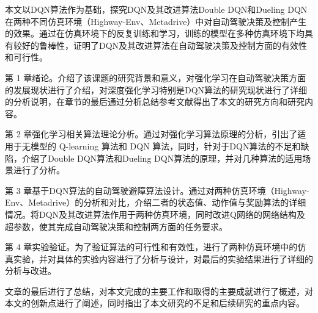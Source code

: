 本文以DQN算法作为基础，探究DQN及其改进算法Double DQN和Dueling DQN在两种不同仿真环境（Highway-Env、Metadrive）中对自动驾驶决策及控制产生的效果。通过在仿真环境下的反复训练和学习，训练的模型在多种仿真环境下均具有较好的鲁棒性，证明了DQN及其改进算法在自动驾驶决策及控制方面的有效性和可行性。

第 1 章绪论。介绍了该课题的研究背景和意义，对强化学习在自动驾驶决策方面的发展现状进行了介绍，对深度强化学习特别是DQN算法的研究现状进行了详细的分析说明，在章节的最后通过分析总结参考文献得出了本文的研究方向和研究内容。

第 2 章强化学习相关算法理论分析。通过对强化学习算法原理的分析，引出了适用于无模型的 Q-learning 算法和 DQN 算法，同时，针对于DQN算法的不足和缺陷，介绍了Double DQN算法和Dueling DQN算法的原理，并对几种算法的适用场景进行了分析。

第 3 章基于DQN算法的自动驾驶避障算法设计。通过对两种仿真环境（Highway-Env、Metadrive）的分析和对比，介绍二者的状态值、动作值与奖励算法的详细情况。将DQN及其改进算法作用于两种仿真环境，同时改进Q网络的网络结构及超参数，使其完成自动驾驶决策和控制两方面的任务要求。

第 4 章实验验证。为了验证算法的可行性和有效性，进行了两种仿真环境中的仿真实验，并对具体的实验内容进行了分析与设计，对最后的实验结果进行了详细的分析与改进。

文章的最后进行了总结，对本文完成的主要工作和取得的主要成就进行了概述，对本文的创新点进行了阐述，同时指出了本文研究的不足和后续研究的重点内容。

